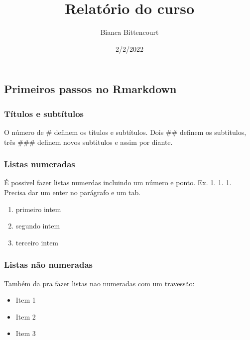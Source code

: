 \documentclass[
]{article}
\title{Relatório do curso}
\author{Bianca Bittencourt}
\date{2/2/2022}
\providecommand{\tightlist}{%
  \setlength{\itemsep}{0pt}\setlength{\parskip}{0pt}}
\begin{document}
\maketitle

\hypertarget{primeiros-passos-no-rmarkdown}{%
\subsection{Primeiros passos no
Rmarkdown}\label{primeiros-passos-no-rmarkdown}}

\hypertarget{tuxedtulos-e-subtuxedtulos}{%
\subsubsection{Títulos e subtítulos}\label{tuxedtulos-e-subtuxedtulos}}

O número de \# definem os títulos e subtítulos. Dois \#\# definem os
subtitulos, três \#\#\# definem novos subtitulos e assim por diante.

\hypertarget{listas-numeradas}{%
\subsubsection{Listas numeradas}\label{listas-numeradas}}

É possivel fazer listas numerdas incluindo um número e ponto. Ex. 1. 1.
1. Precisa dar um enter no parágrafo e um tab.

\begin{enumerate}
\def\labelenumi{\arabic{enumi}.}
\tightlist
\item
  primeiro intem
\item
  segundo intem
\item
  terceiro intem
\end{enumerate}

\hypertarget{listas-nuxe3o-numeradas}{%
\subsubsection{Listas não numeradas}\label{listas-nuxe3o-numeradas}}

Também da pra fazer listas nao numeradas com um travessão:

\begin{itemize}
\tightlist
\item
  Item 1
\item
  Item 2
\item
  Item 3
\end{itemize}
\end{document}
